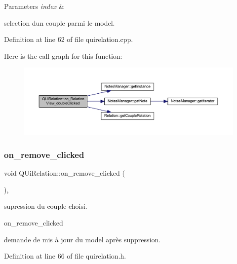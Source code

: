 \begin{DoxyParams}{Parameters}
{\em index} & \\
\hline
\end{DoxyParams}
selection d\textquotesingle{}un couple parmi le model. 

Definition at line 62 of file quirelation.\+cpp.

Here is the call graph for this function\+:\nopagebreak
\begin{figure}[H]
\begin{center}
\leavevmode
\includegraphics[width=350pt]{class_q_ui_relation_a28751a4ca2c2efb17c12bb45811a4b27_cgraph}
\end{center}
\end{figure}
\mbox{\label{class_q_ui_relation_a14fddadaa70fa8c82a0e49a547e2f6b5}} 
\subsubsection{\texorpdfstring{on\+\_\+remove\+\_\+clicked}{on\_remove\_clicked}}
{\footnotesize\ttfamily void Q\+Ui\+Relation\+::on\+\_\+remove\+\_\+clicked (\begin{DoxyParamCaption}{ }\end{DoxyParamCaption})\hspace{0.3cm}{\ttfamily [inline]}, {\ttfamily [slot]}}



supression du couple choisi. 

on\+\_\+remove\+\_\+clicked

demande de mis à jour du model après suppression. 

Definition at line 66 of file quirelation.\+h.

